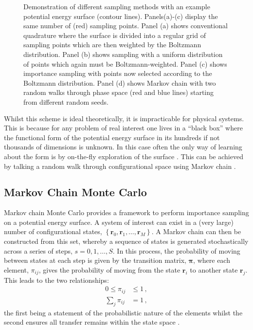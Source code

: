 \begin{figure}[bt]
     \caption{Demonstration of different sampling methods with an example \td{} potential energy surface (contour lines). Panels(a)\--(c) display the same number of (red) sampling points. Panel (a) shows conventional quadrature where the surface is divided into a regular grid of sampling points which are then weighted by the Boltzmann distribution. Panel (b) shows \mc{} sampling with a uniform distribution of points which again must be Boltzmann\--weighted. Panel (c) shows \mc{} importance sampling with points now selected according to the Boltzmann distribution. Panel (d) shows Markov chain \mc{} with two random walks through phase space (red and blue lines) starting from different random seeds.}
     \label{fig:montecarloint}
\end{figure}

Whilst this scheme is ideal theoretically, it is impracticable for physical systems.
This is because for any problem of real interest one lives in a ``black box'' where the functional form of the potential energy surface in its hundreds if not thousands of dimensions is unknown.
In this case often the only way of learning about the form is by on\--the\--fly exploration of the surface \cite{Brooks2011}.
This can be achieved by talking a random walk through configurational space using Markov chain \mc.

\subsection{Markov Chain Monte Carlo}

Markov chain Monte Carlo provides a framework to perform importance sampling on a potential energy surface.
A system of interest can exist in a (very large) number of configurational states, $\left\{\mathbf{r}_0,\mathbf{r}_1,\dots,\mathbf{r}_M\right\}$.
A Markov chain can then be constructed from this set, whereby a sequence of states is generated stochastically across a series of steps, $s=0,1,\dots,S$.
In this process, the probability of moving between states at each step is given by the transition matrix, $\bm{\pi}$, where each element, $\pi_{ij}$, gives the probability of moving from the state $\mathbf{r}_i$ to another state $\mathbf{r}_j$.  
This leads to the two relationships:
\begin{align}
	0\leq \pi_{ij} &\leq 1\,, \\
	\sum_{j} \pi_{ij} &= 1\,, \label{eq:tmrowsum}
\end{align}
the first being a statement of the probabilistic nature of the elements whilst the second ensures all transfer remains within the state space \cite{Frenkel2002,Allen2017,Brooks2011}.

